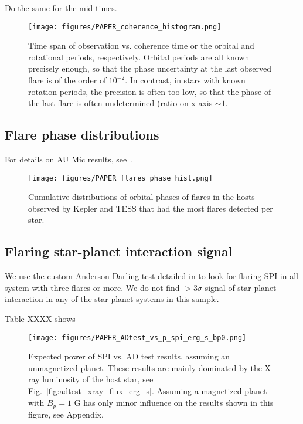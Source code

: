 \documentclass[twocolumn]{aastex631}
\begin{document}
Do the same for the mid-times.

\begin{figure}[ht!]
    \begin{centering}
        \texttt{[image: figures/PAPER\_coherence\_histogram.png]}
        \caption{
           Time span of observation vs. coherence time or the orbital and rotational periods, respectively. Orbital periods are all known precisely enough, so that the phase uncertainty at the last observed flare is of the order of $10^{-2}$. In contrast, in stars with known rotation periods, the precision is often too low, so that the phase of the last flare is often undetermined (ratio on x-axis $\sim 1$.
        }
        \label{fig:coherence_hist}
    \end{centering}
\end{figure}

\subsection{Flare phase distributions}

For details on AU Mic results, see~\citep{ilin2022searching}.

\begin{figure*}[ht!]
    \begin{centering}
        \texttt{[image: figures/PAPER\_flares\_phase\_hist.png]}
        \caption{
            Cumulative distributions of orbital phases of flares in the hosts observed by Kepler and TESS that had the most flares detected per star. 
        }
        \label{fig:cumdist_active}
    \end{centering}
\end{figure*}


\subsection{Flaring star-planet interaction signal}
We use the custom Anderson-Darling test detailed in \cite{ilin2022searching} to look for flaring SPI in all system with three flares or more. We do not find $>3\sigma$ signal of star-planet interaction in any of the star-planet systems in this sample.  

Table XXXX shows



\begin{figure*}[ht!]
    \begin{centering}
        \texttt{[image: figures/PAPER\_ADtest\_vs\_p\_spi\_erg\_s\_bp0.png]}
        \caption{
            Expected power of SPI vs. AD test results, assuming an unmagnetized planet. These results are mainly dominated by the X-ray luminosity of the host star, see Fig.~\ref{fig:adtest_xray_flux_erg_s}. Assuming a magnetized planet with $B_p=1$ G has only minor influence on the results shown in this figure, see Appendix.
        }
        \label{fig:adtest_p_spi_erg_s_bp0}
    \end{centering}
\end{figure*}
\end{document}
